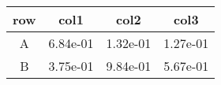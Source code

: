 \begin{tabular}{cccc}
\toprule
row&col1&col2&col3\tabularnewline
\midrule
A&6.84e-01&1.32e-01&1.27e-01\tabularnewline
B&3.75e-01&9.84e-01&5.67e-01\tabularnewline
\bottomrule
\end{tabular}
